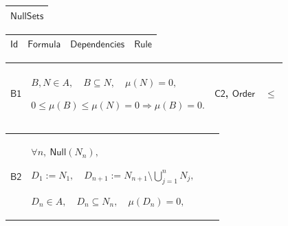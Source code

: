 \documentclass[11pt]{amsart}
\renewcommand{\arraystretch}{1.4}
\newlength{\FTCOneColumnBody}
\newlength{\FTCFourColumnBody}
\begin{document}
{\centering
\renewcommand{\arraystretch}{1.4}
\par\setlength{\parskip}{0pt}\nointerlineskip
\noindent
\begin{tabular}{|@{}>{\centering\arraybackslash}m{\FTCOneColumnBody}|}\hline
$\displaystyle \textsf{NullSets}$\\ \hline
\end{tabular}%
\par\setlength{\parskip}{0pt}\nointerlineskip
\noindent
\begin{tabular}{|@{}>{\centering\arraybackslash}m{0.078431\FTCFourColumnBody}|>{\centering\arraybackslash}m{0.535947\FTCFourColumnBody}|>{\centering\arraybackslash}m{0.281045\FTCFourColumnBody}|>{\centering\arraybackslash}m{0.104575\FTCFourColumnBody}|}\hline
$\displaystyle \textsf{Id}$ & $\displaystyle \textsf{Formula}$ & $\displaystyle \textsf{Dependencies}$ & $\displaystyle \textsf{Rule}$\\ \hline
\end{tabular}%
\par\setlength{\parskip}{0pt}\nointerlineskip
\noindent
\begin{tabular}{|@{}>{\centering\arraybackslash}m{0.078431\FTCFourColumnBody}|>{\centering\arraybackslash}m{0.535947\FTCFourColumnBody}|>{\centering\arraybackslash}m{0.281045\FTCFourColumnBody}|>{\centering\arraybackslash}m{0.104575\FTCFourColumnBody}|}\hline
\hypertarget{dct:B1}{$\displaystyle \textsf{B1}$} & $\displaystyle B,N\in A,\quad B\subseteq N,\quad\mu(N)=0,$\par
$\displaystyle 0\le\mu(B)\le\mu(N)=0\Rightarrow\mu(B)=0.$ & \hyperlink{proof:C2}{$\displaystyle \textsf{C2}$}, \hyperlink{ax:Order}{$\displaystyle \textsf{Order}$} & $\displaystyle \le$\\ \hline
\end{tabular}%
\par\setlength{\parskip}{0pt}\nointerlineskip
\noindent
\begin{tabular}{|@{}>{\centering\arraybackslash}m{0.078431\FTCFourColumnBody}|>{\centering\arraybackslash}m{0.535947\FTCFourColumnBody}|>{\centering\arraybackslash}m{0.281045\FTCFourColumnBody}|>{\centering\arraybackslash}m{0.104575\FTCFourColumnBody}|}\hline
\hypertarget{dct:B2}{$\displaystyle \textsf{B2}$} & $\displaystyle \forall n,\ \textsf{Null}(N_n),$\par
$\displaystyle D_1:=N_1,\quad D_{n+1}:=N_{n+1}\setminus\bigcup_{j=1}^nN_j,$\par
$\displaystyle D_n\in A,\quad D_n\subseteq N_n,\quad\mu(D_n)=0,$\par

\end{tabular}}
\end{document}
